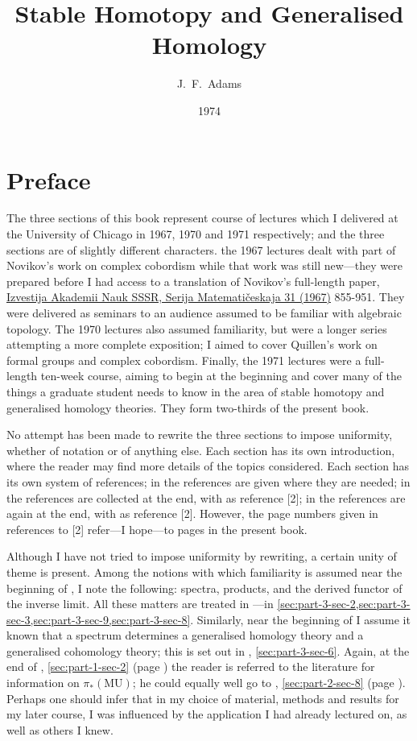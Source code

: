 \documentclass[english, oneside, letterpaper]{book}
\title{Stable Homotopy and Generalised Homology}
\author{J.\ F.\ Adams}
\date{1974}
\newcommand{\MU}{\mathrm{MU}}
\begin{document}
\frontmatter
\maketitle
\tableofcontents
\chapter*{\centering Preface}

The three sections of this book represent course of lectures which I delivered at the University of Chicago in 1967, 1970 and 1971 respectively; and the three sections are of slightly different characters. the 1967 lectures dealt with part of Novikov's work on complex cobordism while that work was still new---they were prepared before I had access to a translation of Novikov's full-length paper, \href{http://www.mathnet.ru/php/archive.phtml?wshow=paper&jrnid=im&paperid=2568&option_lang=eng}{Izvestija Akademii Nauk SSSR, Serija Matematičeskaja 31 (1967)} 855-951. They were delivered as seminars to an audience assumed to be familiar with algebraic topology. The 1970 lectures also assumed familiarity, but were a longer series attempting a more complete exposition; I aimed to cover Quillen's work on formal groups and complex cobordism. Finally, the 1971 lectures were a full-length ten-week course, aiming to begin at the beginning and cover many of the things a graduate student needs to know in the area of stable homotopy and generalised homology theories. They form two-thirds of the present book.

No attempt has been made to rewrite the three sections to impose uniformity, whether of notation or of anything else. Each section has its own introduction, where the reader may find more details of the topics considered. Each section has its own system of references; in  the references are given where they are needed; in  the references are collected at the end, with  as reference [2]; in  the references are again at the end, with  as reference [2]. However, the page numbers given in references to [2] refer---I hope---to pages in the present book.

Although I have not tried to impose uniformity by rewriting, a certain unity of theme is present. Among the notions with which familiarity is assumed near the beginning of , I note the following: spectra, products, and the derived functor of the inverse limit. All these matters are treated in ---in \cref{sec:part-3-sec-2,sec:part-3-sec-3,sec:part-3-sec-9,sec:part-3-sec-8}. Similarly, near the beginning of  I assume it known that a spectrum determines a generalised homology theory and a generalised cohomology theory; this is set out in , \cref{sec:part-3-sec-6}. Again, at the end of , \cref{sec:part-1-sec-2} (page \pageref{page-adams-7}) the reader is referred to the literature for information on $\pi_*(\MU)$; he could equally well go to , \cref{sec:part-2-sec-8} (page \pageref{page-adams-75}). Perhaps one should infer that in my choice of material, methods and results for my later course, I was influenced by the application I had already lectured on, as well as others I knew.
\end{document}
